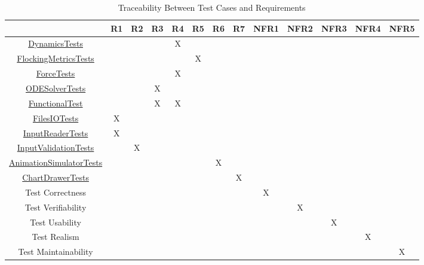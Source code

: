 \documentclass[12pt, titlepage]{article}
\begin{document}
\begin{table}[h!]
\caption{Traceability Between Test Cases and Requirements} \label{tblTraceToRequire} 
\centering
\begin{tabular}{|c|c|c|c|c|c|c|c|c|c|c|c|c|}
\hline
	& R1 & R2 & R3 & R4 & R5 & R6 & R7 & NFR1 & NFR2 & NFR3 & NFR4 & NFR5 \\
\hline
\href{https://github.com/Mei0725/FlockingSimulator/blob/main/src/Assets/Tests/FlockingCalculator/DynamicsTests.cs}{DynamicsTests}
& & & &X& & & & & & & & \\ \hline
\href{https://github.com/Mei0725/FlockingSimulator/blob/main/src/Assets/Tests/FunctionalTest/FlockingMetricsTests.cs}{FlockingMetricsTests}
& & & & &X& & & & & & & \\ \hline
\href{https://github.com/Mei0725/FlockingSimulator/blob/main/src/Assets/Tests/FunctionalTest/ForceTests.cs}{ForceTests}
& & & &X& & & & & & & & \\ \hline
\href{https://github.com/Mei0725/FlockingSimulator/blob/main/src/Assets/Tests/FunctionalTest/ODESolverTests.cs}{ODESolverTests}
& & &X& & & & & & & & & \\ \hline
\href{https://github.com/Mei0725/FlockingSimulator/blob/main/src/Assets/Tests/FunctionalTest/FunctionalTest.cs}{FunctionalTest}
& & &X&X& & & & & & & & \\ \hline
\href{https://github.com/Mei0725/FlockingSimulator/blob/main/src/Assets/Tests/IO/FilesIOTests.cs}{FilesIOTests}
&X& & & & & & & & & & & \\ \hline
\href{https://github.com/Mei0725/FlockingSimulator/blob/main/src/Assets/Tests/IO/InputReaderTests.cs}{InputReaderTests}
&X& & & & & & & & & & & \\ \hline
\href{https://github.com/Mei0725/FlockingSimulator/blob/main/src/Assets/Tests/IO/InputValidationTests.cs}{InputValidationTests}
& &X& & & & & & & & & & \\ \hline
\href{https://github.com/Mei0725/FlockingSimulator/blob/main/src/Assets/Tests/Visualization/AnimationSimulatorTests.cs}{AnimationSimulatorTests}
& & & & & &X& & & & & & \\ \hline
\href{https://github.com/Mei0725/FlockingSimulator/blob/main/src/Assets/Tests/Visualization/ChartDrawerTests.cs}{ChartDrawerTests}
& & & & & & &X& & & & & \\ \hline
Test Correctness        & & & & & & & &X& & & & \\ \hline
Test Verifiability      & & & & & & & & &X& & & \\ \hline
Test Usability          & & & & & & & & & &X& & \\ \hline
Test Realism            & & & & & & & & & & &X& \\ \hline
Test Maintainability    & & & & & & & & & & & &X\\ \hline
\end{tabular}
\end{table}
		
\end{document}
